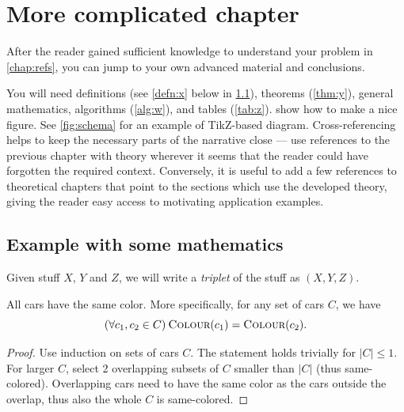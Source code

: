 \chapter{More complicated chapter}
\label{chap:math}

After the reader gained sufficient knowledge to understand your problem in \cref{chap:refs}, you can jump to your own advanced material and conclusions.

You will need definitions (see \cref{defn:x} below in \cref{sec:demo}), theorems (\cref{thm:y}), general mathematics, algorithms (\cref{alg:w}), and tables (\cref{tab:z}).  show how to make a nice figure. See \cref{fig:schema} for an example of TikZ-based diagram. Cross-referencing helps to keep the necessary parts of the narrative close --- use references to the previous chapter with theory wherever it seems that the reader could have forgotten the required context. Conversely, it is useful to add a few references to theoretical chapters that point to the sections which use the developed theory, giving the reader easy access to motivating application examples.

\section{Example with some mathematics}
\label{sec:demo}

\begin{defn}[Triplet]\label{defn:x}
Given stuff $X$, $Y$ and $Z$, we will write a \emph{triplet} of the stuff as $(X,Y,Z)$.
\end{defn}

\newcommand{\Col}{\textsc{Colour}}

\begin{thm}\label{thm:y}
All cars have the same color. More specifically, for any set of cars $C$, we have
$$(\forall c_1, c_2 \in C)\:\Col(c_1) = \Col(c_2).$$
\end{thm}

\begin{proof}
Use induction on sets of cars $C$. The statement holds trivially for $|C|\leq1$. For larger $C$, select 2 overlapping subsets of $C$ smaller than $|C|$ (thus same-colored). Overlapping cars need to have the same color as the cars outside the overlap, thus also the whole $C$ is same-colored.
\end{proof}

